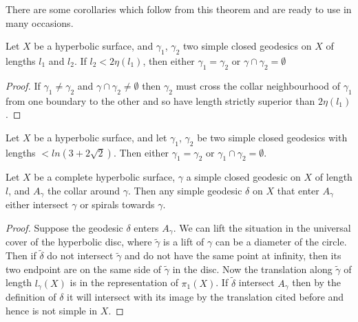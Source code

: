 There are some corollaries which follow from this theorem and are ready to use in many occasions.

\begin{cor}
Let $X$ be a hyperbolic surface, and $\gamma_1$, $\gamma_2$ two simple closed geodesics on $X$ of lengths $l_1$ and $l_2$. If $l_2 < 2 \eta(l_1)$, then either $\gamma_1=\gamma_2$ or $\gamma \cap \gamma_2 = \emptyset$
\end{cor}

\begin{proof}
If $\gamma_1 \neq \gamma_2$ and $\gamma \cap \gamma_2 \neq \emptyset$ then $\gamma_2$ must cross the collar neighbourhood of $\gamma_1$ from one boundary to the other and so have length strictly superior than $2 \eta(l_1)$.
\end{proof}

\begin{cor}
Let $X$ be a hyperbolic surface, and let $\gamma_1$, $\gamma_2$ be two simple closed geodesics with lengths $< ln(3+2 \sqrt{2})$. Then either $\gamma_1=\gamma_2$ or $\gamma_1 \cap \gamma_2 = \emptyset$.
\end{cor}

\begin{cor}
Let $X$ be a complete hyperbolic surface, $\gamma$ a simple closed geodesic on $X$ of length $l$, and $A_{\gamma}$ the collar around $\gamma$. Then any simple geodesic $\delta$ on $X$ that enter $A_{\gamma}$ either intersect $\gamma$ or spirals towards $\gamma$.
\end{cor}

\begin{proof}
Suppose the geodesic $\delta$ enters $A_{\gamma}$. We can lift the situation in the universal cover of the hyperbolic disc, where $\tilde{\gamma}$ is a lift of $\gamma$ can be a diameter of the circle. Then if $\tilde{\delta}$ do not intersect $\tilde{\gamma}$
and do not have the same point at infinity, then its two endpoint are on the same side of $\tilde{\gamma}$ in the disc. Now the translation along $\tilde{\gamma}$ of length $l_{\gamma}(X)$ is in the representation of $\pi_1(X)$.
If $\tilde{\delta}$ intersect $A_{\gamma}$ then by the definition of $\delta$ it will intersect with its image by the translation cited before and hence is not simple in $X$.
\end{proof}
